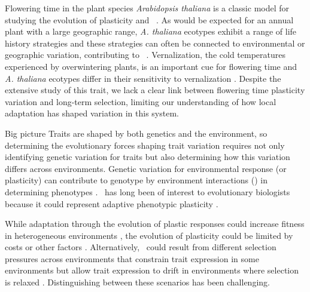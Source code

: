 Flowering time in the plant species \textit{Arabidopsis thaliana} is a classic model for studying the evolution of plasticity and \gxe\  \citep{mitchell2006genetic, maple2024flowering, leventhal2025planting}.
As would be expected for an annual plant with a large geographic range, \textit{A. thaliana} ecotypes exhibit a range of life history strategies and these strategies can often be connected to environmental or geographic variation, contributing to \gxe\ \citep{stinchcombe2004latitudinal, mitchell2006genetic, hancock2011adaptation,martinez2020functional}.
Vernalization, the cold temperatures experienced by overwintering plants, is an important cue for flowering time and \textit{A. thaliana} ecotypes differ in their sensitivity to vernalization \citep{shindo2006variation, sung2005remembering}.
Despite the extensive study of this trait, we lack a clear link between flowering time plasticity variation and long-term selection, limiting our understanding of how local adaptation has shaped variation in this system.

Big picture
Traits are shaped by both genetics and the environment, so determining the evolutionary forces shaping trait variation requires not only identifying genetic variation for traits but also determining how this variation differs across environments.
Genetic variation for environmental response (or plasticity) can contribute to genotype by environment interactions (\gxe) in determining phenotypes \citep{falconer1952problem, bradshaw1965evolutionary}.
\gxe\ has long been of interest to evolutionary biologists because it could represent adaptive phenotypic plasticity  \citep{schlichting1986evolution,scheiner1993genetics}.


While adaptation through the evolution of plastic responses could increase fitness in heterogeneous environments \citep{van1991evolution, baythavong2011linking, anderson2021selection}, the evolution of plasticity could be limited by costs or other factors \citep{dewitt1998costs, callahan2005plasticity, roberts2023weaker}.
Alternatively, \gxe\ could result from different selection pressures across environments that constrain trait expression in some environments but allow trait expression to drift in environments where selection is relaxed \citep{paaby2014cryptic}.
Distinguishing between these scenarios has been challenging.

